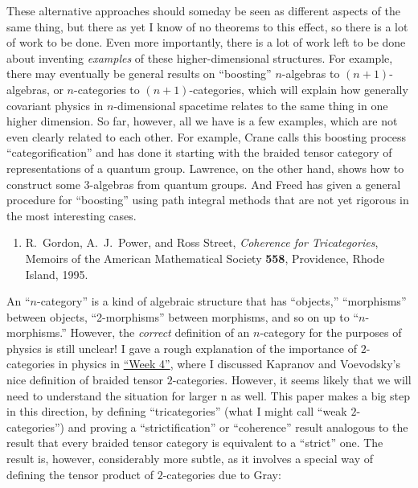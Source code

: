 \documentclass[12pt]{article}
\def\tightlist{}
\begin{document}
These alternative approaches should someday be seen as different aspects
of the same thing, but there as yet I know of no theorems to this
effect, so there is a lot of work to be done. Even more importantly,
there is a lot of work left to be done about inventing \emph{examples}
of these higher-dimensional structures. For example, there may
eventually be general results on ``boosting'' \(n\)-algebras to
\((n+1)\)-algebras, or \(n\)-categories to \((n+1)\)-categories, which
will explain how generally covariant physics in \(n\)-dimensional
spacetime relates to the same thing in one higher dimension. So far,
however, all we have is a few examples, which are not even clearly
related to each other. For example, Crane calls this boosting process
``categorification'' and has done it starting with the braided tensor
category of representations of a quantum group. Lawrence, on the other
hand, shows how to construct some 3-algebras from quantum groups. And
Freed has given a general procedure for ``boosting'' using path integral
methods that are not yet rigorous in the most interesting cases.

\begin{enumerate}
\def\labelenumi{\arabic{enumi})}
\setcounter{enumi}{1}
\tightlist
\item
   R.\ Gordon, A.\ J.\ Power, and Ross
  Street, \emph{Coherence for Tricategories}, Memoirs of the American
  Mathematical Society \textbf{558}, Providence, Rhode Island, 1995.
\end{enumerate}

An ``\(n\)-category'' is a kind of algebraic structure that has
``objects,'' ``morphisms'' between objects, ``2-morphisms'' between
morphisms, and so on up to ``\(n\)-morphisms.'' However, the
\emph{correct} definition of an \(n\)-category for the purposes of
physics is still unclear! I gave a rough explanation of the importance
of \(2\)-categories in physics in \protect\hyperlink{week4}{``Week 4''},
where I discussed Kapranov and Voevodsky's nice definition of braided
tensor \(2\)-categories. However, it seems likely that we will need to
understand the situation for larger n as well. This paper makes a big
step in this direction, by defining ``tricategories'' (what I might call
``weak \(2\)-categories'') and proving a ``strictification'' or
``coherence'' result analogous to the result that every braided tensor
category is equivalent to a ``strict'' one. The result is, however,
considerably more subtle, as it involves a special way of defining the
tensor product of \(2\)-categories due to Gray:
\end{document}
